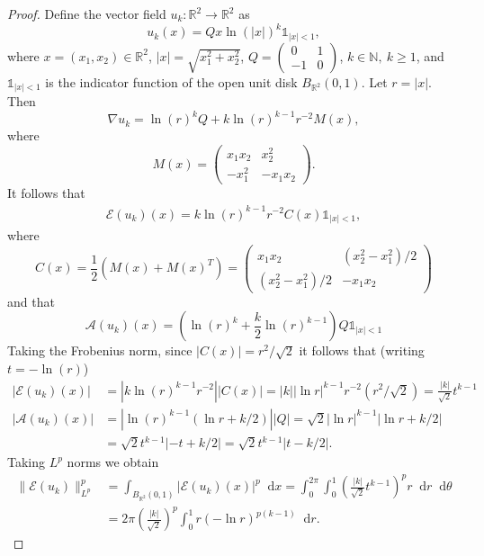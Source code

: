 \documentclass[10pt,a4paper]{amsart}
\newcommand{\R}{\mathbb{R}}
\newcommand{\abs}[1]{|#1|}
\newcommand*\diff{\mathop{}\!\mathrm{d}}
\newcommand{\mat}[1]{
    \begin{pmatrix} #1 \end{pmatrix}
}
\newcommand{\norm}[1]{\|#1\|}
\begin{document}
\begin{proof}
Define the vector field $u_k\colon \R^2 \to \R^2$ as 
\begin{equation*}
u_k(x) = Q x \ln(\abs{x})^k \mathds{1}_{\abs{x}<1},
\end{equation*}
where $x=(x_1, x_2) \in \R^2$,
$\abs{x} = \sqrt{x_1^2 + x_2^2}$,
$Q = \mat{0 & 1 \\ -1 & 0}$, $k\in \mathbb N,\ k\ge 1$,
and $\mathds{1}_{\abs{x}<1}$
is the indicator function of the open unit disk
$B_{\R^2}(0,1)$.
Let $r = \abs{x}$. Then
\begin{equation*}
\nabla u_k = \ln(r)^k Q + k \ln(r)^{k-1} r^{-2} M(x),
\end{equation*} where 
\begin{equation*}
M(x) = \mat{x_1x_2 & x_2^2 \\ -x_1^2 & -x_1x_2}.
\end{equation*}
It follows that
\begin{align*}
\mathcal E(u_k)(x)
= k \ln(r)^{k-1} r^{-2} C(x) \mathds{1}_{\abs{x}<1},
\end{align*}
where 
\begin{equation*}
C(x) = \frac{1}{2}(M(x)+M(x)^T)
= \mat{x_1x_2 & (x_2^2-x_1^2)/2
\\ (x_2^2-x_1^2)/2 & -x_1x_2}
\end{equation*}
and that
\begin{equation*}
\mathcal A(u_k)(x) =
\left(\ln(r)^k + \frac{k}{2} \ln(r)^{k-1}\right)
Q \mathds{1}_{\abs{x}<1}
\end{equation*}
Taking the Frobenius norm, since
$|C(x)| = r^2 / \sqrt{2}$ 
it follows that (writing $t=-\ln(r)$)
\begin{align*}
|\mathcal E(u_k)(x)|
&= \abs{k \ln(r)^{k-1} r^{-2}} |C(x)|
= \abs{k} \abs{\ln r}^{k-1} r^{-2} (r^2 / \sqrt{2})
= \frac{\abs{k}}{\sqrt{2}} t^{k-1}\\
|\mathcal A(u_k)(x)|
&= \abs{\ln(r)^{k-1}(\ln r + k/2)} |Q|
= \sqrt{2} \abs{\ln r}^{k-1} \abs{\ln r + k/2}\\
&= \sqrt{2} t^{k-1} \abs{-t + k/2}
= \sqrt{2} t^{k-1} \abs{t - k/2}.
\end{align*}
Taking $L^p$ norms we obtain
\begin{align*}
\norm{\mathcal E(u_k)}_{L^p}^p& = \int_{B_{\R^2}(0,1)}
|\mathcal E(u_k)(x)|^p \diff x
= \int_0^{2\pi} \int_0^1
\left(\frac{\abs{k}}{\sqrt{2}} t^{k-1}\right)^p
r \diff r \diff \theta\\&
= 2\pi \left(\frac{\abs{k}}{\sqrt{2}}\right)^p
\int_0^1 r (-\ln r)^{p(k-1)} \diff r.

\end{align*}
\end{proof}
\end{document}
